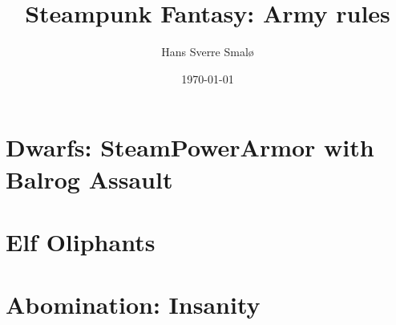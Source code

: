 \documentclass[a4,12pt, color, hyperref]{book}
\title{Steampunk Fantasy: Army rules}
\author{Hans Sverre Smalø}
\date{\today}
\begin{document}
\maketitle
\setcounter{tocdepth}{1}
\tableofcontents

%

\chapter{Dwarfs: SteamPowerArmor with Balrog Assault}


\chapter{Elf Oliphants}


\chapter{Abomination: Insanity}

\end{document}
